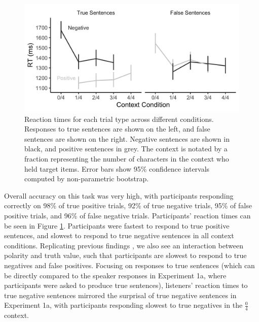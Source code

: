 \documentclass[man, floatsintext, noapacite]{apa6}
\begin{document}
\begin{figure}[t]
\begin{center} 
\includegraphics[width=6in]{figures/experiment1/listener_rts.png}
\caption{\label{fig:exp1_listenerrt} Reaction times for each trial type across different conditions. Responses to true sentences are shown on the left, and false sentences are shown on the right.  Negative sentences are shown in black, and positive sentences in grey.  The context is notated by a fraction representing the number of characters in the context who held target items. Error bars show 95\% confidence intervals computed by non-parametric bootstrap.}
\end{center} 
\end{figure}

Overall accuracy on this task was very high, with participants responding correctly on 98\% of true positive trials, 92\% of true negative trials, 95\% of false positive trials, and 96\% of false negative trials.  Participants' reaction times can be seen in Figure \ref{fig:exp1_listenerrt}. Participants were fastest to respond to true positive sentences, and slowest to respond to true negative sentences in all context conditions. Replicating previous findings \cite{hclark1972}, we also see an interaction between polarity and truth value, such that participants are slowest to respond to true negatives and false positives. Focusing on responses to true sentences (which can be directly compared to the speaker responses in Experiment 1a, where participants were asked to produce true sentences), listeners' reaction times to true negative sentences mirrored the surprisal of true negative sentences in Experiment 1a, with participants responding slowest to true negatives in the $\frac{0}{4}$ context.
\end{document}

